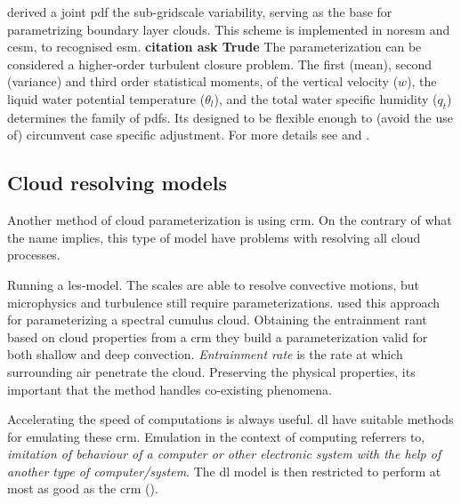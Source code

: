 \cite{Golaz2002_part1} derived a joint \acrshort{pdf} the sub-gridscale variability, serving as the base for parametrizing boundary layer clouds. This scheme is implemented in \acrfull{noresm} and \acrfull{cesm}, to recognised \acrshort{esm}. \textbf{citation ask Trude} The parameterization can be considered a higher-order turbulent closure problem. The first (mean), second (variance) and third order statistical moments, of the vertical velocity ($w$), the liquid water potential temperature ($\theta_l$), and the total water specific humidity ($q_t$) determines the family of \acrshort{pdf}s. Its designed to be flexible enough to (avoid the use of) circumvent case specific adjustment. For more details see \cite{Golaz2002_part1} and \cite{Golaz2002_part2}.

\subsection{Cloud resolving models} \label{sec:params_climate_models}
Another method of cloud parameterization is using \acrshort{crm}. On the contrary of what the name implies, this type of model have problems with resolving all cloud processes. 

Running a \acrfull{les}-model. The scales are able to resolve convective motions, but microphysics and turbulence still require parameterizations. \cite{Baba2019SpectralModel} used this approach for parameterizing a spectral cumulus cloud. Obtaining the entrainment rant based on cloud properties from a \acrshort{crm} they build a parameterization valid for both shallow and deep convection. \textit{
Entrainment rate} is the rate at which surrounding air penetrate the cloud. Preserving the physical properties, its important that the method handles co-existing phenomena. 

Accelerating the speed of computations is always useful. \acrshort{dl} have suitable methods for emulating these \acrshort{crm}. Emulation in the context of computing referrers to, \textit{imitation of behaviour of a computer or other electronic system with the help of another type of computer/system}. The \acrshort{dl} model is then restricted to perform at most as good as the \acrshort{crm} (\cite{Rasp2018DeepModels}).